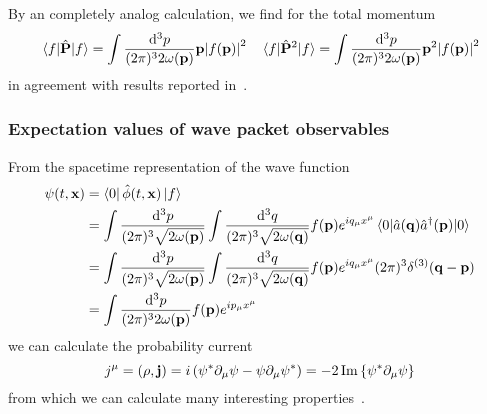 By an completely analog calculation, we find for the total momentum
\begin{align}
	\expval{\hat{\vb{P}}}{f}
	=
	\int\frac{\dd[3]{p}}{(2\pi)^32\omega(\vb{p})}
	\vb{p}
	\abs{f(\vb{p})}^2
	&&
	\expval{\hat{\vb{P}}^2}{f}
	=
	\int\frac{\dd[3]{p}}{(2\pi)^32\omega(\vb{p})}
	\vb{p}^2
	\abs{f(\vb{p})}^2
\end{align}
in agreement with results reported in~\cite[eqs.~10 and 11]{Naumov2013}.

\subsubsection{Expectation values of wave packet observables}

From the spacetime representation of the wave function
\begin{equation}
	\begin{split}
		\psi(t,\vb{x})
		&=
		\bra{0}\hat\phi(t,\vb{x})\ket{f}
		\\
		&=
		\int\frac{\dd[3]{p}}{(2\pi)^3\sqrt{2\omega(\vb{p})}}
		\int\frac{\dd[3]{q}}{(2\pi)^3\sqrt{2\omega(\vb{q})}}
		f(\vb{p})e^{iq_\mu x^\mu}
		\expval{\hat{a}(\vb{q})\hat{a}^\dagger(\vb{p})}{0}
		\\
		&=
		\int\frac{\dd[3]{p}}{(2\pi)^3\sqrt{2\omega(\vb{p})}}
		\int\frac{\dd[3]{q}}{(2\pi)^3\sqrt{2\omega(\vb{q})}}
		f(\vb{p})e^{iq_\mu x^\mu}
		(2\pi)^3\delta^{(3)}(\vb{q}-\vb{p})
		\\
		&=
		\int\frac{\dd[3]{p}}{(2\pi)^32\omega(\vb{p})}
		f(\vb{p})e^{ip_\mu x^\mu}
	\end{split}
\end{equation}
we can calculate the probability current
\begin{equation}
	j^\mu
	=
	\left(\rho,\vb{j}\right)
	=
	i\left(
		\psi^*\partial_\mu\psi
		-
		\psi\partial_\mu\psi^*
	\right)
	=
	-2\operatorname{\operatorname{Im}}\left\{
		\psi^*\partial_\mu\psi
	\right\}
	\label{eq:qkg_probability_current}
\end{equation}
from which we can calculate many interesting properties~\cite{Naumov2013}.

